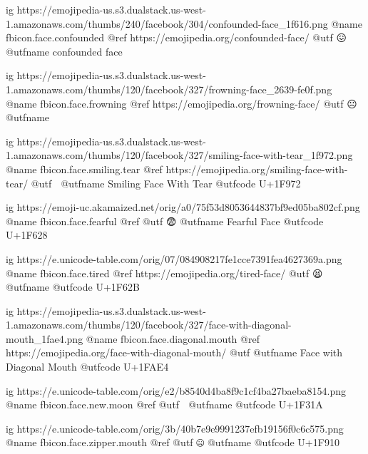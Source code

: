 	ig https://emojipedia-us.s3.dualstack.us-west-1.amazonaws.com/thumbs/240/facebook/304/confounded-face_1f616.png
	@name fbicon.face.confounded
	@ref https://emojipedia.org/confounded-face/
	@utf 😖
	@utfname confounded face

	ig https://emojipedia-us.s3.dualstack.us-west-1.amazonaws.com/thumbs/120/facebook/327/frowning-face_2639-fe0f.png
	@name fbicon.face.frowning
	@ref https://emojipedia.org/frowning-face/
	@utf ☹️
	@utfname

	ig https://emojipedia-us.s3.dualstack.us-west-1.amazonaws.com/thumbs/120/facebook/327/smiling-face-with-tear_1f972.png
	@name fbicon.face.smiling.tear
	@ref https://emojipedia.org/smiling-face-with-tear/
	@utf 🥲
	@utfname Smiling Face With Tear
	@utfcode U+1F972

	ig https://emoji-uc.akamaized.net/orig/a0/75f53d8053644837bf9ed05ba802cf.png
	@name fbicon.face.fearful
	@ref
	@utf 😨
	@utfname Fearful Face
	@utfcode U+1F628

	ig https://e.unicode-table.com/orig/07/084908217fe1cce7391fea4627369a.png
	@name fbicon.face.tired
	@ref https://emojipedia.org/tired-face/
	@utf 😫
	@utfname
	@utfcode U+1F62B

	ig https://emojipedia-us.s3.dualstack.us-west-1.amazonaws.com/thumbs/120/facebook/327/face-with-diagonal-mouth_1fae4.png
	@name fbicon.face.diagonal.mouth
	@ref https://emojipedia.org/face-with-diagonal-mouth/
	@utf
	@utfname Face with Diagonal Mouth
	@utfcode U+1FAE4

	ig https://e.unicode-table.com/orig/e2/b8540d4ba8f9c1cf4ba27baeba8154.png
	@name fbicon.face.new.moon
	@ref
	@utf 🌚
	@utfname
	@utfcode U+1F31A

	ig https://e.unicode-table.com/orig/3b/40b7e9e9991237efb19156f0c6c575.png
	@name fbicon.face.zipper.mouth
	@ref
	@utf 🤐
	@utfname
	@utfcode U+1F910

\fi
